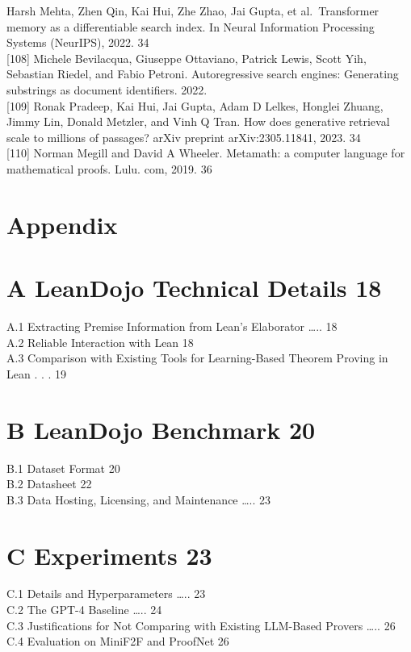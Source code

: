 \documentclass[
]{article}
\begin{document}
Harsh Mehta, Zhen Qin, Kai Hui, Zhe Zhao, Jai Gupta, et al.~Transformer
memory as a differentiable search index. In Neural Information
Processing Systems (NeurIPS), 2022. 34\\
{[}108{]} Michele Bevilacqua, Giuseppe Ottaviano, Patrick Lewis, Scott
Yih, Sebastian Riedel, and Fabio Petroni. Autoregressive search engines:
Generating substrings as document identifiers. 2022.\\
{[}109{]} Ronak Pradeep, Kai Hui, Jai Gupta, Adam D Lelkes, Honglei
Zhuang, Jimmy Lin, Donald Metzler, and Vinh Q Tran. How does generative
retrieval scale to millions of passages? arXiv preprint
arXiv:2305.11841, 2023. 34\\
{[}110{]} Norman Megill and David A Wheeler. Metamath: a computer
language for mathematical proofs. Lulu. com, 2019. 36

\section{Appendix}\label{appendix}

\section{A LeanDojo Technical Details
18}\label{a-leandojo-technical-details-18}

A.1 Extracting Premise Information from Lean's Elaborator \ldots.. 18\\
A.2 Reliable Interaction with Lean 18\\
A.3 Comparison with Existing Tools for Learning-Based Theorem Proving in
Lean . . . 19

\section{B LeanDojo Benchmark 20}\label{b-leandojo-benchmark-20}

B.1 Dataset Format 20\\
B.2 Datasheet 22\\
B.3 Data Hosting, Licensing, and Maintenance \ldots.. 23

\section{C Experiments 23}\label{c-experiments-23}

C.1 Details and Hyperparameters \ldots.. 23\\
C.2 The GPT-4 Baseline \ldots.. 24\\
C.3 Justifications for Not Comparing with Existing LLM-Based Provers
\ldots.. 26\\
C.4 Evaluation on MiniF2F and ProofNet 26
\end{document}
